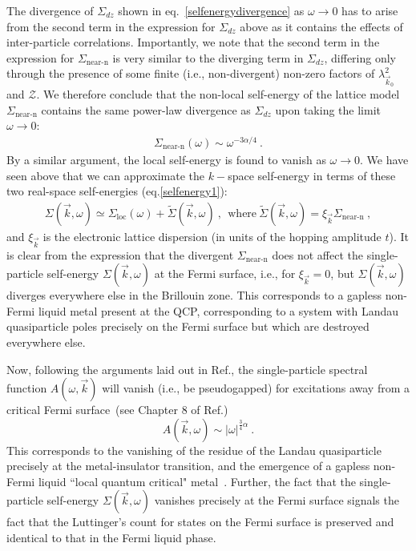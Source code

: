 \documentclass[reprint,hidelinks]{revtex4-2}
\begin{document}
\begin{widetext}
The divergence of \(\Sigma_{dz}\) shown in eq.~\ref{selfenergydivergence} as \(\omega \to 0\) has to arise from the second term in the expression for \(\Sigma_{dz}\) above as it contains the effects of inter-particle correlations.
Importantly, we note that the second term in the expression for \(\Sigma_\text{near-n}\) is very similar to the diverging term in \(\Sigma_{dz}\), differing only through the presence of some finite (i.e., non-divergent) non-zero factors of \(\lambda_{\vec k_0}^2\) and \(\mathcal{Z}\). We therefore conclude that the non-local self-energy of the lattice model $\Sigma_\text{near-n}$ contains the same power-law divergence  as $\Sigma_{dz}$ upon taking the limit $\omega\to 0$:
\begin{equation}\begin{aligned}
	\Sigma_\text{near-n}\left( \omega \right) \sim \omega^{-3\alpha/4}~.
\end{aligned}\end{equation}
By a similar argument, the local self-energy is found to vanish as \(\omega \to 0\). We have seen above that we can approximate the \(k-\)space self-energy in terms of these two real-space self-energies (eq.\eqref{selfenergy1}):
\begin{equation}\begin{aligned}
	\Sigma(\vec k, \omega) \simeq \Sigma_\text{loc}(\omega) + \tilde{\Sigma}(\vec k, \omega)~,~~\textrm{where}~\tilde{\Sigma}(\vec k, \omega)=\xi_{\vec k}\Sigma_\text{near-n}~,
\end{aligned}\end{equation}
and $\xi_{\vec{k}}$ is the electronic lattice dispersion (in units of the hopping amplitude $t$). It is clear from the expression that the divergent $\Sigma_\text{near-n}$ does not affect the single-particle self-energy $\Sigma(\vec k,\omega)$ at the Fermi surface, i.e., for $\xi_{\vec{k}}= 0$, but $\Sigma(\vec k,\omega)$ diverges everywhere else in the Brillouin zone. This corresponds to a gapless non-Fermi liquid metal present at the QCP, corresponding to a system with Landau quasiparticle poles precisely on the Fermi surface but which are destroyed everywhere else.

Now, following the arguments laid out in Ref.\cite{sujan2023}, the single-particle spectral function $A(\omega,\vec{k})$ will vanish (i.e., be pseudogapped) for excitations away from a critical Fermi surface~(see Chapter 8 of Ref.\cite{carr2010})
\begin{equation}
A(\vec{k},\omega) \sim |\omega|^{\frac{3}{4}\alpha}~.
\end{equation}	
This corresponds to the vanishing of the residue of the Landau quasiparticle precisely at the metal-insulator transition, and the emergence of a gapless non-Fermi liquid ``local quantum critical" metal~\cite{Si2001}. Further, the fact that the single-particle self-energy $\Sigma(\vec k, \omega)$ vanishes precisely at the Fermi surface signals the fact that the Luttinger's count for states on the Fermi surface is preserved and identical to that in the Fermi liquid phase. 




\end{widetext}
\end{document}
